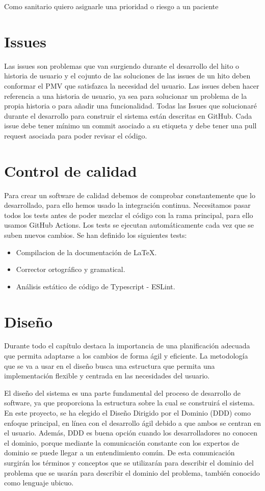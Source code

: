 Como sanitario quiero asignarle una prioridad o riesgo a un paciente

\section{Issues}
Las issues son problemas que van surgiendo durante el desarrollo del hito o historia de usuario y
el cojunto de las soluciones de las issues de un hito deben conformar el PMV que satisfazca la necesidad del usuario.
Las issues deben hacer referencia a una historia de usuario, ya sea para solucionar un problema de la propia historia o para añadir una funcionalidad.
Todas las Issues que solucionaré durante el desarrollo para construir el sistema están descritas en GitHub. Cada issue debe tener mínimo un commit asociado a su
etiqueta y debe tener una pull request asociada para poder revisar el código.

\section{Control de calidad}
Para crear un software de calidad debemos de comprobar constantemente que lo desarrollado, para ello hemos usado la integración continua.
Necesitamos pasar todos los tests antes de poder mezclar el código con la rama principal, para ello usamos GitHub Actions.
Los tests se ejecutan automáticamente cada vez que se suben nuevos cambios. Se han definido los siguientes tests:

\begin{itemize}
    \item{Compilacion de la documentación de LaTeX.}
    \item{Corrector ortográfico y gramatical.}
    \item{Análisis estático de código de Typescript - ESLint.}
\end{itemize}

\section{Diseño}
Durante todo el capítulo destaca la importancia de una planificación adecuada que permita adaptarse a los cambios de forma ágil y eficiente.
La metodología que se va a usar en el diseño busca una estructura que permita una implementación flexible y centrada en las necesidades del usuario.

El diseño del sistema es una parte fundamental del proceso de desarrollo de software, ya que proporciona la estructura sobre la cual se construirá el sistema.
En este proyecto, se ha elegido el Diseño Dirigido por el Dominio (DDD) \cite{domain-drive-design} como enfoque principal, en línea con el desarrollo ágil debido a que ambos se centran en el usuario.
Además, DDD es buena opción cuando los desarrolladores no conocen el dominio, porque mediante la comunicación constante con los expertos de dominio se puede llegar a un entendimiento común.
De esta comunicación surgirán los términos y conceptos que se utilizarán para describir el dominio del problema que se usarán para describir el dominio del problema, también conocido como lenguaje ubicuo.

